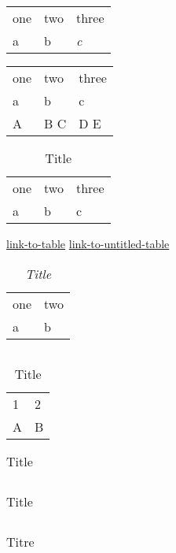\begin{tabular}{lll}
one & two & three \\
a & b & \emph{c} \\
\end{tabular}
\hypertarget{label1}{}\begin{tabular}{lll}
one & two & three \\
a & b & c \\
A & B 
C & D
E \\
\end{tabular}
\begin{table}[htbp]
\begin{tabular}{lll}
one & two & three \\
a & b & c \\
\end{tabular}
\caption{Title}
\label{tbl:1}
\end{table}
\hyperref[tbl:1]{link-to-table}
\hyperlink{label1}{link-to-untitled-table}

\setcounter{tocdepth}{3}
\listoftables
\begin{table}[htbp]
\begin{tabular}{ll}
one & two \\
a & b \\
\end{tabular}
\caption{\emph{Title}}
\label{tbl:2}
\end{table}
\begin{tabular}{}
\end{tabular}
\begin{table}[htbp]
\begin{tabular}{ll}
1 & 2 \\
A & B \\
\end{tabular}
\caption{Title}
\label{tbl:3}
\end{table}
\begin{table}[htbp]
\begin{tabular}{}
\end{tabular}
\caption{Title}
\label{tbl:4}
\end{table}
\begin{table}[htbp]
\begin{tabular}{}

\end{tabular}
\caption{Title}
\label{tbl:5}
\end{table}
\begin{table}[htbp]
\begin{tabular}{}
\end{tabular}
\caption{Titre}
\label{tbl:6}
\end{table}
